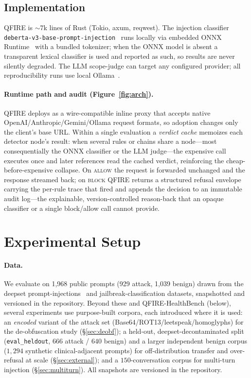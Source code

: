 \documentclass[11pt]{article}
\providecommand{\NumPrompts}{1{,}968}
\providecommand{\NumAttacks}{929}
\providecommand{\NumBenign}{1{,}039}
\begin{document}
\subsection{Implementation}
QFIRE is ${\sim}7$k lines of Rust (Tokio, axum, reqwest). The injection
classifier \texttt{deberta-\allowbreak v3-\allowbreak base-\allowbreak prompt-\allowbreak injection}~\cite{protectai_deberta}
runs locally via embedded ONNX Runtime~\cite{ort} with a bundled tokenizer; when
the ONNX model is absent a transparent lexical classifier is used and reported as
such, so results are never silently degraded. The LLM scope-judge can target any
configured provider; all reproducibility runs use local Ollama~\cite{ollama}.

\paragraph{Runtime path and audit (Figure~\ref{fig:arch}).} QFIRE deploys as a
wire-compatible inline proxy that accepts native OpenAI/Anthropic/Gemini/Ollama
request formats, so adoption changes only the client's base URL. Within a single
evaluation a \emph{verdict cache} memoizes each detector node's result: when several
rules or chains share a node---most consequentially the ONNX classifier or the LLM
judge---the expensive call executes once and later references read the cached verdict,
reinforcing the cheap-before-expensive collapse. On \textsc{allow} the request is
forwarded unchanged and the response streamed back; on \textsc{block} QFIRE returns a
structured refusal envelope carrying the per-rule trace that fired and appends the
decision to an immutable audit log---the explainable, version-controlled reason-back
that an opaque classifier or a single block/allow call cannot provide.

\section{Experimental Setup}
\paragraph{Data.} We evaluate on \NumPrompts{} public prompts
(\NumAttacks{} attack, \NumBenign{} benign) drawn from the
deepset prompt-injections~\cite{deepset_pi} and jailbreak-classification
\cite{jailbreak_cls} datasets, snapshotted and versioned in the repository.
Beyond these and QFIRE-HealthBench (below), several experiments use purpose-built
corpora, each introduced where it is used: an \emph{encoded} variant of the attack
set (Base64/\allowbreak ROT13/\allowbreak leetspeak/\allowbreak homoglyphs) for the de-obfuscation study
(\S\ref{sec:deobf}); a held-out, deepset-decontaminated split (\texttt{eval\_heldout},
$666$ attack / $640$ benign) and a larger independent benign corpus ($1{,}294$
synthetic clinical-adjacent prompts) for off-distribution transfer and over-refusal
at scale (\S\ref{sec:external}); and a $150$-conversation corpus for multi-turn
injection (\S\ref{sec:multiturn}). All snapshots are versioned in the repository.
\end{document}

